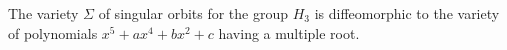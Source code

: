 The variety $\Sigma$ of singular orbits for the group $H_3$ is diffeomorphic to the variety of polynomials $x^5 + a x^4 + b x^2 + c$ having a multiple root.
